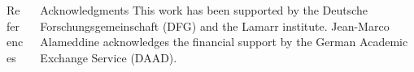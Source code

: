 \documentclass[t]{beamer}
\begin{document}
  \vspace*{\fill}
  \begin{columns}[onlytextwidth]%
    \begin{column}{0.75\textwidth}%
      \begin{alertblock}[equal height group=bottom, fonttitle=\normalsize]{References}
        \begin{multicols}{3}
          \footnotesize%
          \printbibliography%
        \end{multicols}
      \end{alertblock}
    \end{column}
    \begin{column}{0.25\textwidth}%
      \begin{alertblock}[equal height group=bottom, fonttitle=\normalsize]{Acknowledgments}
          \footnotesize%
          This work has been supported by the Deutsche Forschungsgemeinschaft (DFG) and the Lamarr institute.
          Jean-Marco Alameddine acknowledges the financial support by the German Academic Exchange Service (DAAD).
      \end{alertblock}
    \end{column}
  \end{columns}

\end{document}
